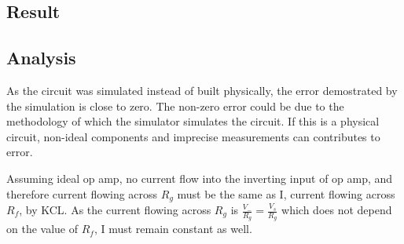 \documentclass{article}
\begin{document}
\newpage

\subsection*{Result}
\begin{table}[H]
\end{table}

\subsection*{Analysis}
As the circuit was simulated instead of built physically, the error demostrated by the simulation is close to zero. The non-zero error could be due to the methodology of which the simulator simulates the circuit. If this is a physical circuit, non-ideal components and imprecise measurements can contributes to error.

Assuming ideal op amp, no current flow into the inverting input of op amp, and therefore current flowing across $R_g$ must be the same as I, current flowing across $R_f$, by KCL. As the current flowing across $R_g$ is $\frac{V_-}{R_g}=\frac{V_s}{R_g}$ which does not depend on the value of $R_f$, I must remain constant as well.

\newpage
\end{document}
